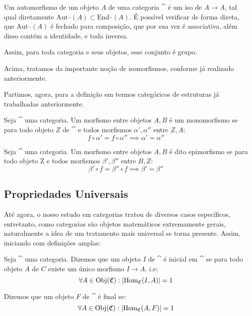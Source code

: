\documentclass[../main]{subfiles}
\begin{document}
Um automorfismo de um objeto \(A\) de uma categoria \(\cat\) é um iso de \(A \to
A\), tal qual diretamente \(\text{Aut}_\cat (A) \subset \text{End}_\cat(A)\). É
possível verificar de forma direta, que \(\text{Aut}_\cat(A)\) é fechado para
composição, que por sua vez é associativa, além disso contém a identidade, e
toda inversa. 

Assim, para toda categoria e seus objetos, esse conjunto é grupo.

Acima, tratamos da importante noção de isomorfismos, conforme já realizado
anteriormente. 

Partimos, agora, para a definição em termos categóricos de estruturas já
trabalhadas anteriormente.
\begin{definition}[Monomorfismo]
    Seja \(\cat\) uma categoria. Um morfismo entre objetos \(A, B\) é um
    monomorfismo se para todo objeto \(Z\) de \(\cat\) e todos morfismos
    \(\alpha', \alpha''\) entre \(Z, A\):
    \[f \circ \alpha' = f \circ \alpha'' \implies \alpha' = \alpha''\]
\end{definition}

\begin{definition}[Epimorfismo]
    Seja \(\cat\) uma categoria. Um morfismo entre objetos \(A, B \) é dito
    epimorfismo se para todo objeto Z e todos morfismos \(\beta', \beta''\)
    entre \(B, Z\):
    \[\beta' \circ f = \beta'' \circ f \implies \beta' = \beta''\]
\end{definition}

\subsection{Propriedades Universais}

Até agora, o nosso estudo em categorias tratou de diversos casos específicos,
entretanto, como categorias são objetos matemáticos extremamente gerais,
naturalmente a idea de um tratamento mais universal se torna presente. Assim,
iniciando com definições amplas:
\begin{definition}
    Seja \(\cat\) uma categoria. Dizemos que um objeto \(I\) de \(\cat\) é
    inicial em \(\cat\) se para todo objeto \(A\) de \(C\) existe um único
    morfismo \(I \to A\). i.e:
    \[\forall A \in \text{Obj}(\mathfrak{C}) : |\text{Hom}_{\mathfrak{C}}(I, A)| = 1\]
\end{definition}

\begin{definition}
    Dizemos que um objeto \(F\) de \(\cat\) é final se: 
    \[\forall A \in \text{Obj} (\mathfrak{C}): |\text{Hom}_{\mathfrak{C}}(A, F)| = 1\]
\end{definition}
\end{document}
